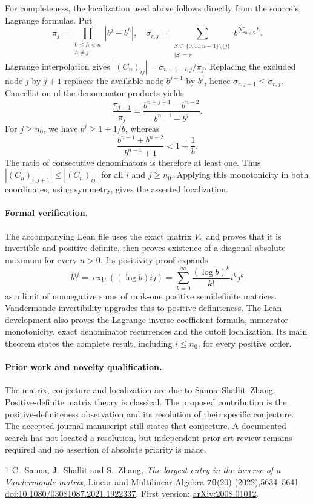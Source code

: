 \documentclass[11pt]{article}
\begin{document}
For completeness, the localization used above follows directly from the source's Lagrange formulas. Put
\[
 \pi_j=\prod_{\substack{0\le h<n\\h\ne j}}|b^j-b^h|,
 \quad
 \sigma_{r,j}=\sum_{\substack{S\subset\{0,\ldots,n-1\}\setminus\{j\}\\|S|=r}}
 b^{\sum_{h\in S}h}.
\]
Lagrange interpolation gives $|(C_n)_{ij}|=\sigma_{n-1-i,j}/\pi_j$.
Replacing the excluded node $j$ by $j+1$ replaces the available node $b^{j+1}$ by $b^j$, hence $\sigma_{r,j+1}\le\sigma_{r,j}$. Cancellation of the denominator products yields
\[
 \frac{\pi_{j+1}}{\pi_j}
 =\frac{b^{n+j-1}-b^{n-2}}{b^{n-1}-b^j}.
\]
For $j\ge n_0$, we have $b^j\ge1+1/b$, whereas
\[
 \frac{b^{n-1}+b^{n-2}}{b^{n-1}+1}<1+\frac1b.
\]
The ratio of consecutive denominators is therefore at least one. Thus $|(C_n)_{i,j+1}|\le|(C_n)_{ij}|$ for all $i$ and $j\ge n_0$. Applying this monotonicity in both coordinates, using symmetry, gives the asserted localization.

\paragraph{Formal verification.}
The accompanying Lean file uses the exact matrix $V_n$ and proves that it is invertible and positive definite, then proves existence of a diagonal absolute maximum for every $n>0$. Its positivity proof expands
\[
 b^{ij}=\exp((\log b)ij)
 =\sum_{k=0}^{\infty}\frac{(\log b)^k}{k!}i^k j^k
\]
as a limit of nonnegative sums of rank-one positive semidefinite matrices. Vandermonde invertibility upgrades this to positive definiteness. The Lean development also proves the Lagrange inverse coefficient formula, numerator monotonicity, exact denominator recurrences and the cutoff localization. Its main theorem states the complete result, including $i\le n_0$, for every positive order.

\paragraph{Prior work and novelty qualification.}
The matrix, conjecture and localization are due to Sanna--Shallit--Zhang. Positive-definite matrix theory is classical. The proposed contribution is the positive-definiteness observation and its resolution of their specific conjecture. The accepted journal manuscript still states that conjecture. A documented search has not located a resolution, but independent prior-art review remains required and no assertion of absolute priority is made.

\begin{thebibliography}{1}
 C.~Sanna, J.~Shallit and S.~Zhang,
\emph{The largest entry in the inverse of a Vandermonde matrix},
Linear and Multilinear Algebra \textbf{70}(20) (2022),5634--5641.
\href{https://doi.org/10.1080/03081087.2021.1922337}{doi:10.1080/03081087.2021.1922337}.
First version: \href{https://arxiv.org/abs/2008.01012}{arXiv:2008.01012}.
\end{thebibliography}
\end{document}
